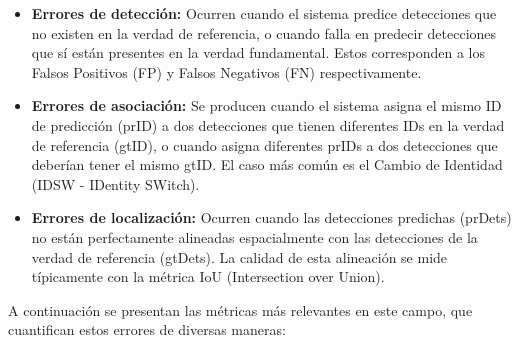\documentclass[11pt,spanish,listoffigures,listoftables]{tfgetsinf}
\begin{document}
\begin{itemize}
   \item \textbf{Errores de detección:} Ocurren cuando el sistema predice detecciones que no existen en la verdad de referencia, o cuando falla en predecir detecciones que sí están presentes en la verdad fundamental. Estos corresponden a los Falsos Positivos (FP) y Falsos Negativos (FN) respectivamente.
   
   \item \textbf{Errores de asociación:} Se producen cuando el sistema asigna el mismo ID de predicción (prID) a dos detecciones que tienen diferentes IDs en la verdad de referencia (gtID), o cuando asigna diferentes prIDs a dos detecciones que deberían tener el mismo gtID. El caso más común es el Cambio de Identidad (IDSW - IDentity SWitch).
   
   \item \textbf{Errores de localización:} Ocurren cuando las detecciones predichas (prDets) no están perfectamente alineadas espacialmente con las detecciones de la verdad de referencia (gtDets). La calidad de esta alineación se mide típicamente con la métrica IoU (Intersection over Union).
\end{itemize}

A continuación se presentan las métricas más relevantes en este campo, que cuantifican estos errores de diversas maneras:
\end{document}
